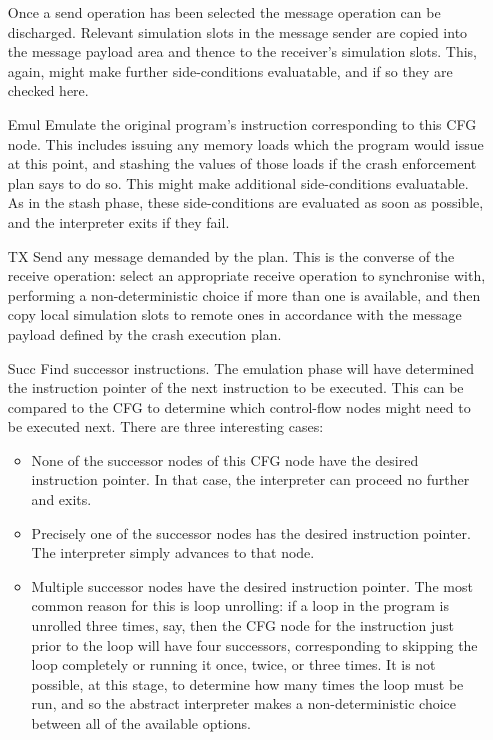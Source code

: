 \begin{itemize}
  Once a send operation has been selected the message operation can be discharged.
  Relevant simulation slots in the message sender are copied into the message payload area and thence to the receiver's simulation slots.
  This, again, might make further side-conditions evaluatable, and if so they are checked here.
\item[Emul]
  Emulate the original program's instruction corresponding to this CFG node.
  This includes issuing any memory loads which the program would issue at this point, and stashing the values of those loads if the crash enforcement plan says to do so.
  This might make additional side-conditions evaluatable.
  As in the stash phase, these side-conditions are evaluated as soon as possible, and the interpreter exits if they fail.
\item[TX]
  Send any message demanded by the plan.
  This is the converse of the receive operation: select an appropriate receive operation to synchronise with, performing a non-deterministic choice if more than one is available, and then copy local simulation slots to remote ones in accordance with the message payload defined by the crash execution plan.
\item[Succ]
  Find successor instructions.
  The emulation phase will have determined the instruction pointer of the next instruction to be executed.
  This can be compared to the CFG to determine which control-flow nodes might need to be executed next.
  There are three interesting cases:

  \begin{itemize}
  \item
    None of the successor nodes of this CFG node have the desired instruction pointer.
    In that case, the interpreter can proceed no further and exits.
  \item
    Precisely one of the successor nodes has the desired instruction pointer.
    The interpreter simply advances to that node.
  \item
    Multiple successor nodes have the desired instruction pointer.
    The most common reason for this is loop unrolling: if a loop in the program is unrolled three times, say, then the CFG node for the instruction just prior to the loop will have four successors, corresponding to skipping the loop completely or running it once, twice, or three times.
    It is not possible, at this stage, to determine how many times the loop must be run, and so the abstract interpreter makes a non-deterministic choice between all of the available options.
  \end{itemize}
\end{itemize}

